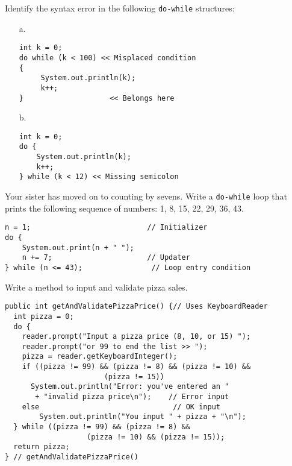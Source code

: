\begin{ANS}
\item  Identify the syntax error in the following {\tt do-while} structures:
\begin{enumerate}

\item[a.]

\begin{jjjlisting}
\begin{lstlisting}[basicstyle=\scriptsize]
int k = 0;
do while (k < 100) << Misplaced condition
{
     System.out.println(k);
     k++;
}                    << Belongs here
\end{lstlisting}
\end{jjjlisting}

\item[b.]

\begin{jjjlisting}
\begin{lstlisting}[basicstyle=\scriptsize]
int k = 0;
do {
    System.out.println(k);
    k++;
} while (k < 12) << Missing semicolon
\end{lstlisting}
\end{jjjlisting}

\end{enumerate}


\item  Your sister has moved on to counting by sevens. Write a {\tt do-while}
loop that prints the following sequence of numbers: 1, 8, 15, 22, 29,
36, 43.

\begin{jjjlisting}
\begin{lstlisting}[basicstyle=\scriptsize]
n = 1;                           // Initializer
do {
    System.out.print(n + " ");
    n += 7;                      // Updater
} while (n <= 43);                // Loop entry condition
\end{lstlisting}
\end{jjjlisting}

\item  Write a method to input and validate pizza sales.
\begin{jjjlisting}
\begin{lstlisting}[basicstyle=\scriptsize]
public int getAndValidatePizzaPrice() {// Uses KeyboardReader
  int pizza = 0;
  do {
    reader.prompt("Input a pizza price (8, 10, or 15) ");
    reader.prompt("or 99 to end the list >> ");
    pizza = reader.getKeyboardInteger();
    if ((pizza != 99) && (pizza != 8) && (pizza != 10) && 
                       (pizza != 15))
      System.out.println("Error: you've entered an "
       + "invalid pizza price\n");    // Error input
    else                               // OK input
        System.out.println("You input " + pizza + "\n");                 
  } while ((pizza != 99) && (pizza != 8) && 
                   (pizza != 10) && (pizza != 15));
  return pizza;
} // getAndValidatePizzaPrice()
\end{lstlisting}
\end{jjjlisting}


\end{ANS}
